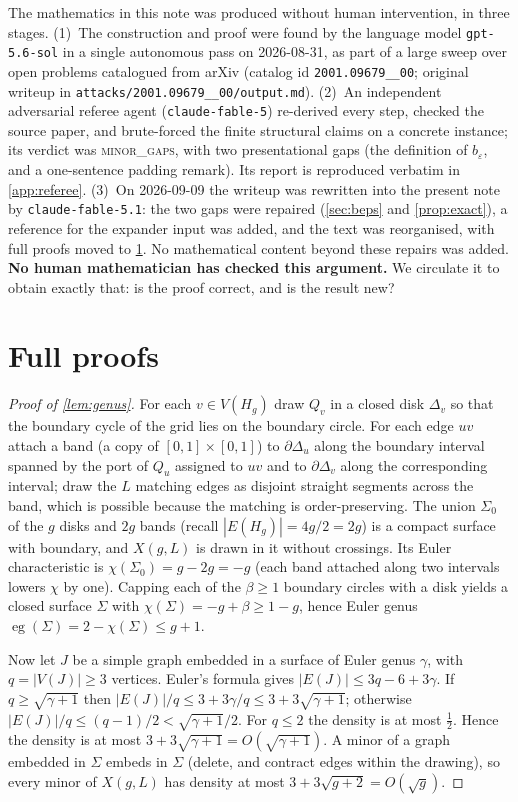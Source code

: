 \documentclass[11pt,a4paper]{article}
\theoremstyle{plain}
\theoremstyle{definition}
\theoremstyle{remark}
\newcommand{\eg}{\operatorname{eg}}
\begin{document}
The mathematics in this note was produced without human intervention, in three stages.
(1)~The construction and proof were found by the language model \texttt{gpt-5.6-sol} in a single autonomous pass on 2026-08-31, as part of a large sweep over open problems catalogued from arXiv (catalog id \texttt{2001.09679\_\_00}; original writeup in \texttt{attacks/2001.09679\_\_00/output.md}).
(2)~An independent adversarial referee agent (\texttt{claude-fable-5}) re-derived every step, checked the source paper, and brute-forced the finite structural claims on a concrete instance; its verdict was \textsc{minor\_gaps}, with two presentational gaps (the definition of $b_\varepsilon$, and a one-sentence padding remark). Its report is reproduced verbatim in \cref{app:referee}.
(3)~On 2026-09-09 the writeup was rewritten into the present note by \texttt{claude-fable-5.1}: the two gaps were repaired (\cref{sec:beps} and \cref{prop:exact}), a reference for the expander input was added, and the text was reorganised, with full proofs moved to \cref{app:proofs}. No mathematical content beyond these repairs was added.
\textbf{No human mathematician has checked this argument.} We circulate it to obtain exactly that: is the proof correct, and is the result new?


\appendix

\section{Full proofs}\label{app:proofs}

\label{pf:genus}
\begin{proof}[Proof of \cref{lem:genus}]
For each $v\in V(H_g)$ draw $Q_v$ in a closed disk $\Delta_v$ so that the boundary cycle of the grid lies on the boundary circle. For each edge $uv$ attach a band (a copy of $[0,1]\times[0,1]$) to $\partial\Delta_u$ along the boundary interval spanned by the port of $Q_u$ assigned to $uv$ and to $\partial\Delta_v$ along the corresponding interval; draw the $L$ matching edges as disjoint straight segments across the band, which is possible because the matching is order-preserving. The union $\Sigma_0$ of the $g$ disks and $2g$ bands (recall $|E(H_g)|=4g/2=2g$) is a compact surface with boundary, and $X(g,L)$ is drawn in it without crossings. Its Euler characteristic is $\chi(\Sigma_0)=g-2g=-g$ (each band attached along two intervals lowers $\chi$ by one). Capping each of the $\beta\ge1$ boundary circles with a disk yields a closed surface $\Sigma$ with $\chi(\Sigma)=-g+\beta\ge1-g$, hence Euler genus $\eg(\Sigma)=2-\chi(\Sigma)\le g+1$.

Now let $J$ be a simple graph embedded in a surface of Euler genus $\gamma$, with $q=|V(J)|\ge3$ vertices. Euler's formula gives $|E(J)|\le3q-6+3\gamma$. If $q\ge\sqrt{\gamma+1}$ then $|E(J)|/q\le3+3\gamma/q\le3+3\sqrt{\gamma+1}$; otherwise $|E(J)|/q\le(q-1)/2<\sqrt{\gamma+1}/2$. For $q\le2$ the density is at most $\frac12$. Hence the density is at most $3+3\sqrt{\gamma+1}=O(\sqrt{\gamma+1})$. A minor of a graph embedded in $\Sigma$ embeds in $\Sigma$ (delete, and contract edges within the drawing), so every minor of $X(g,L)$ has density at most $3+3\sqrt{g+2}=O(\sqrt g)$.
\end{proof}
\end{document}
